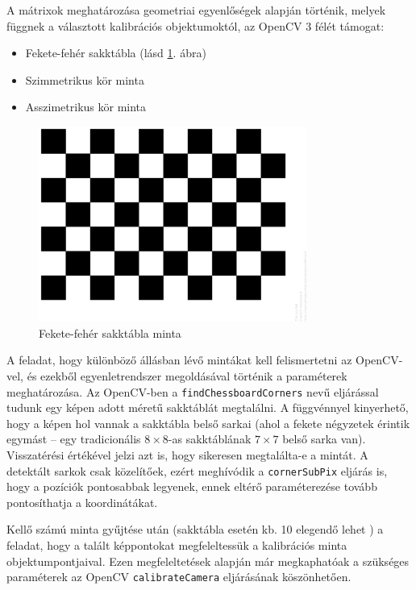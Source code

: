 \documentclass[a4paper,oneside]{article}
\begin{document}
A mátrixok meghatározása geometriai egyenlőségek alapján történik, melyek függnek a választott kalibrációs objektumoktól, az OpenCV 3 félét támogat:
\begin{itemize}[itemsep=0pt]
\item Fekete-fehér sakktábla (lásd \ref{fig:pattern}. ábra)
\item Szimmetrikus kör minta
\item Asszimetrikus kör minta
\end{itemize}

\begin{figure}[tbh]
  \centering
  \includegraphics[width=250pt]{figs/pattern.png}
  \caption{Fekete-fehér sakktábla minta \label{fig:pattern}}
\end{figure}

A feladat, hogy különböző állásban lévő mintákat kell felismertetni az OpenCV-vel, és ezekből egyenletrendszer megoldásával történik a paraméterek meghatározása.
Az OpenCV-ben a \texttt{findChessboardCorners} nevű eljárással tudunk egy képen adott méretű sakktáblát megtalálni. A függvénnyel kinyerhető, hogy a képen hol vannak a sakktábla belső sarkai (ahol a fekete négyzetek érintik egymást -- egy tradicionális $8\times 8$-as sakktáblának $7\times 7$ belső sarka van). Visszatérési értékével jelzi azt is, hogy sikeresen megtalálta-e a mintát. A detektált sarkok csak közelítőek, ezért meghívódik a \texttt{cornerSubPix} eljárás is, hogy a pozíciók pontosabbak legyenek, ennek eltérő paraméterezése tovább pontosíthatja a koordinátákat.

\begin{sloppypar}
Kellő számú minta gyűjtése után (sakktábla esetén kb. 10 elegendő lehet \cite{camera-calib}) a feladat, hogy a talált képpontokat megfeleltessük a kalibrációs minta objektumpontjaival. Ezen megfeleltetések alapján már megkaphatóak a szükséges paraméterek az OpenCV \texttt{calibrateCamera} eljárásának köszönhetően. %
\end{sloppypar}
\end{document}
